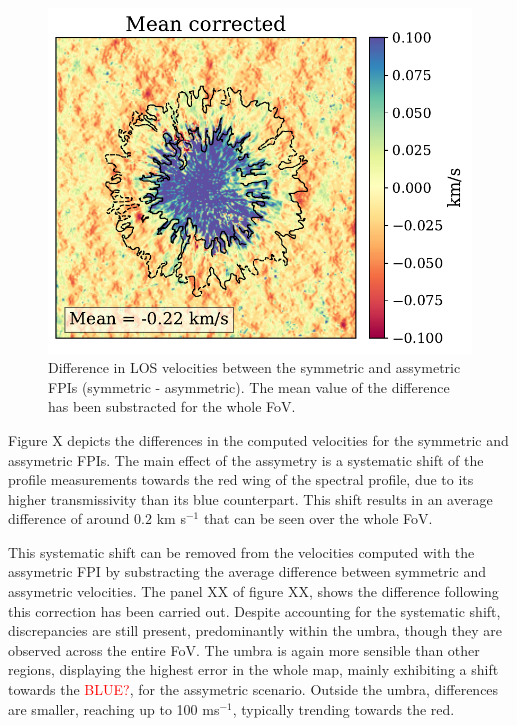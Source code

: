 \begin{figure}
  \begin{minipage}[c]{0.5\textwidth}
    \includegraphics[width=\textwidth]{figures/Mancha/vlos_sym_vs_asym.pdf}
  \end{minipage}\hfill\hfill
  \begin{minipage}[c]{0.47\textwidth}
    \caption{
      Difference in LOS velocities between the symmetric and assymetric FPIs (symmetric - asymmetric). The mean value of the difference has been substracted for the whole FoV. \label{fig_mancha: vlos_asym_vs_sym}} 
  \end{minipage}
\end{figure}

Figure X depicts the differences in the computed velocities for the symmetric and assymetric FPIs. The main effect of the assymetry is a systematic shift of the profile measurements towards the red wing of the spectral profile, due to its higher transmissivity than its blue counterpart. This shift results in an average difference of around $0.2$ km s$^{-1}$ that can be seen over the whole FoV. 

This systematic shift can be removed from the velocities computed with the assymetric FPI by substracting the average difference between symmetric and assymetric velocities. The panel XX of figure XX, shows the difference following this correction has been carried out. Despite accounting for the systematic shift, discrepancies are still present, predominantly within the umbra, though they are observed across the entire FoV. The umbra is again more sensible than other regions, displaying the highest error in the whole map, mainly exhibiting a shift towards the \textcolor{red}{BLUE?}, for the assymetric scenario. Outside the umbra, differences are smaller, reaching up to 100 ms$^{-1}$, typically trending towards the red.

